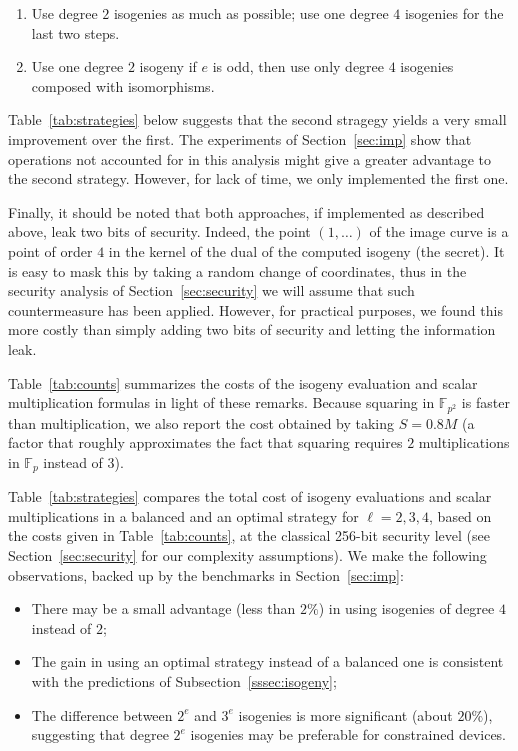 \documentclass[jmc]{degruyter-journal-a}
\theoremstyle{definition}
\newcommand{\FF}{{\mathbb{F}}}
\begin{document}
\begin{enumerate}
\item Use degree $2$ isogenies as much as possible; use one degree $4$
  isogenies for the last two steps.
\item Use one degree $2$ isogeny if $e$ is odd, then use only degree
  $4$ isogenies composed with isomorphisms.
\end{enumerate}

Table~\ref{tab:strategies} below suggests that the second stragegy
yields a very small improvement over the first. The experiments of
Section~\ref{sec:imp} show that operations not accounted for in this
analysis might give a greater advantage to the second
strategy. However, for lack of time, we only implemented the first
one.

Finally, it should be noted that both approaches, if implemented as
described above, leak two bits of security. Indeed, the point
$(1,\ldots)$ of the image curve is a point of order $4$ in the kernel
of the dual of the computed isogeny (the secret). It is easy to mask
this by taking a random change of coordinates, thus in the security
analysis of Section~\ref{sec:security} we will assume that such
countermeasure has been applied. However, for practical purposes, we
found this more costly than simply adding two bits of security and
letting the information leak.

Table~\ref{tab:counts} summarizes the costs of the isogeny evaluation
and scalar multiplication formulas in light of these remarks. Because
squaring in $\FF_{p^2}$ is faster than multiplication, we also report
the cost obtained by taking $S=0.8M$ (a factor that roughly
approximates the fact that squaring requires $2$ multiplications in
$\FF_p$ instead of $3$).

Table~\ref{tab:strategies} compares the total cost of isogeny
evaluations and scalar multiplications in a balanced and an optimal
strategy for $\ell=2,3,4$, based on the costs given in
Table~\ref{tab:counts}, at the classical 256-bit security level (see
Section~\ref{sec:security} for our complexity assumptions). We make the following observations, backed up by the benchmarks in Section~\ref{sec:imp}:
\begin{itemize}
\item There may be a small advantage (less than $2\%$) in using
  isogenies of degree $4$ instead of $2$;
\item The gain in using an optimal strategy instead of a balanced one
  is consistent with the predictions of
  Subsection~\ref{sssec:isogeny};
\item The difference between $2^e$ and $3^e$ isogenies is more
  significant (about $20\%$), suggesting that degree $2^e$ isogenies
  may be preferable for constrained devices.
\end{itemize}
\end{document}
